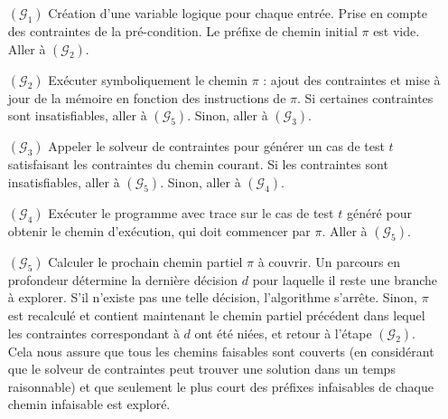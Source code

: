 \begin{itemize}
\item[$(\mathcal{G}_1)$]
Création d'une variable logique pour chaque entrée.
Prise en compte des contraintes de la pré-condition.
Le préfixe de chemin initial $\pi$ est vide.
Aller à $(\mathcal{G}_2)$.

\item[$(\mathcal{G}_2)$]
Exécuter symboliquement le chemin $\pi$ : ajout des contraintes et
mise à jour de la mémoire en fonction des instructions de $\pi$.
Si certaines contraintes sont insatisfiables, aller à $(\mathcal{G}_5)$.
Sinon, aller à $(\mathcal{G}_3)$.

\item[$(\mathcal{G}_3)$]
Appeler le solveur de contraintes pour générer un cas de test $t$ satisfaisant
les contraintes du chemin courant. Si les contraintes sont insatisfiables, aller
à $(\mathcal{G}_5)$.
Sinon, aller à $(\mathcal{G}_4)$.

\item[$(\mathcal{G}_4)$]
Exécuter le programme avec trace sur le cas de test $t$ généré pour obtenir
le chemin d'exécution, qui doit commencer par $\pi$.
Aller à $(\mathcal{G}_5)$.

\item[$(\mathcal{G}_5)$]
Calculer le prochain chemin partiel $\pi$ à couvrir. Un parcours en profondeur
détermine la dernière décision $d$ pour laquelle il reste une branche à
explorer. S'il n'existe pas une telle décision, l'algorithme s'arrête. Sinon,
$\pi$ est recalculé et contient maintenant le chemin partiel précédent dans
lequel les contraintes correspondant à $d$ ont été niées, et retour à l'étape
$(\mathcal{G}_2)$. Cela nous assure que tous les chemins faisables sont couverts
(en considérant que le solveur de contraintes peut trouver une solution dans un
temps raisonnable) et que seulement le plus court des préfixes infaisables de
chaque chemin infaisable est exploré.
\end{itemize}
